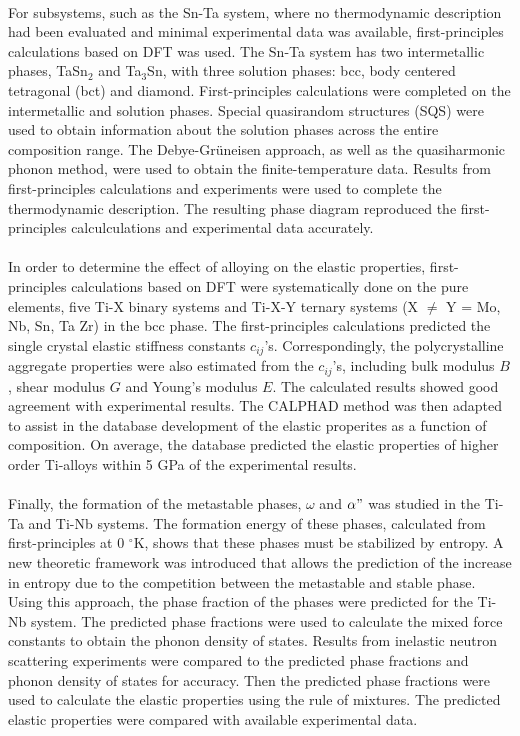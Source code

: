 \paragraph*{} For subsystems, such as the Sn-Ta system, where no thermodynamic description had been evaluated and minimal experimental data was available, first-principles calculations based on DFT was used. The Sn-Ta system has two intermetallic phases, TaSn$_{2}$ and Ta$_{3}$Sn, with three solution phases: bcc, body centered tetragonal (bct) and diamond. First-principles calculations were completed on the intermetallic and solution phases. Special quasirandom structures (SQS) were used to obtain information about the solution phases across the entire composition range. The Debye-Gr\"uneisen approach, as well as the quasiharmonic phonon method, were used to obtain the finite-temperature data. Results from first-principles calculations and experiments were used to complete the thermodynamic description. The resulting phase diagram reproduced the first-principles calculculations and experimental data accurately.
\paragraph*{}In order to determine the effect of alloying on the elastic properties, first-principles calculations based on DFT were systematically done on the pure elements, five Ti-X binary systems and Ti-X-Y ternary systems (X $\neq $ Y = Mo, Nb, Sn, Ta Zr) in the bcc phase. The first-principles calculations predicted the single crystal elastic stiffness constants $c_{ij}$'s. Correspondingly, the polycrystalline aggregate properties were also estimated from the $c_{ij}$'s, including bulk modulus $B$, shear modulus $G$ and Young's modulus $E$. The calculated results showed good agreement with experimental results. The CALPHAD method was then adapted to assist in the database development of the elastic properites as a function of composition. On average, the database predicted the elastic properties of higher order Ti-alloys within 5 GPa of the experimental results.
\paragraph*{} Finally, the formation of the metastable phases, $\omega$ and $\alpha"$ was studied in the Ti-Ta and Ti-Nb systems. The formation energy of these phases, calculated from first-principles at 0 $^\circ$K, shows that these phases must be stabilized by entropy. A new theoretic framework was introduced that allows the prediction of the increase in entropy due to the competition between the metastable and stable phase. Using this approach, the phase fraction of the phases were predicted for the Ti-Nb system. The predicted phase fractions were used to calculate the mixed force constants to obtain the phonon density of states. Results from inelastic neutron scattering experiments were compared to the predicted phase fractions and phonon density of states for accuracy. Then the predicted phase fractions were used to calculate the elastic properties using the rule of mixtures. The predicted elastic properties were compared with available experimental data.
